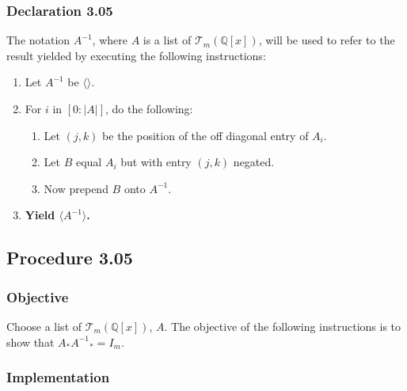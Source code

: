 \documentclass[twocolumn]{article}
\newcommand{\declaration}[1]{\subsubsection*{Declaration #1}\label{sec:declaration #1}}
\newcommand{\procedure}[2][]{\subsection*{Procedure #2 \ifthenelse{\equal{#1}{}}{}{(#1)}}\label{sec:procedure #2}}
\newcommand{\objective}{\subsubsection*{Objective}}
\newcommand{\implementation}{\subsubsection*{Implementation}}
\begin{document}
		\declaration{3.05}
			The notation $A^{-1}$, where $A$ is a list of $\mathcal{T}_{m}(\mathbb{Q}[x])$, will be used to refer to the result yielded by executing the following instructions:
			\begin{enumerate}
				\item Let $A^{-1}$ be $\langle\rangle$.
				\item For $i$ in $[0:\lvert A\rvert]$, do the following:
				\begin{enumerate}
					\item Let $(j,k)$ be the position of the off diagonal entry of $A_i$.
					\item Let $B$ equal $A_i$ but with entry $(j,k)$ negated.
					\item Now prepend $B$ onto $A^{-1}$.
				\end{enumerate}
				\item \textbf{Yield $\langle A^{-1}\rangle$.}
			\end{enumerate}
		\procedure{3.05}
			\objective
				Choose a list of $\mathcal{T}_{m}(\mathbb{Q}[x])$, $A$. The objective of the following instructions is to show that $A_*{A^{-1}}_*=I_m$.
			\implementation
\end{document}
